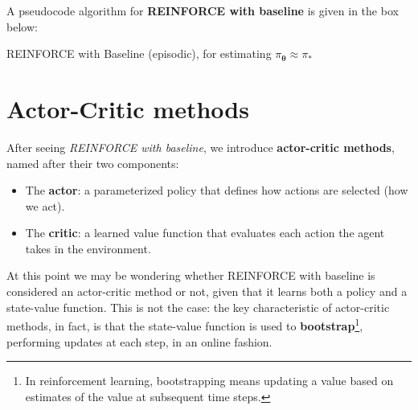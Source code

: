 A pseudocode algorithm for \textbf{REINFORCE with baseline} is given in the box below:

\begin{algorithm}[H]
\DontPrintSemicolon
\SetAlgoVlined
{}

\caption{REINFORCE with Baseline (episodic), for estimating $\pi_{\boldsymbol{\theta}} \approx \pi_*$}
\end{algorithm}

\section{Actor-Critic methods}
After seeing \textit{REINFORCE with baseline}, we introduce \textbf{actor-critic methods}, named after their two components:

\begin{itemize}
    \item The \textbf{actor}: a parameterized policy that defines how actions are selected (how we act).
    \item The \textbf{critic}: a learned value function that evaluates each action the agent takes in the environment.
\end{itemize}

At this point we may be wondering whether REINFORCE with baseline is considered an actor-critic method or not, given that it learns both a policy and a state-value function. This is not the case: the key characteristic of actor-critic methods, in fact, is that the state-value function is used to \textbf{bootstrap}\footnote{In reinforcement learning, bootstrapping means updating a value based on estimates of the value at subsequent time steps.}, performing updates at each step, in an online fashion.

